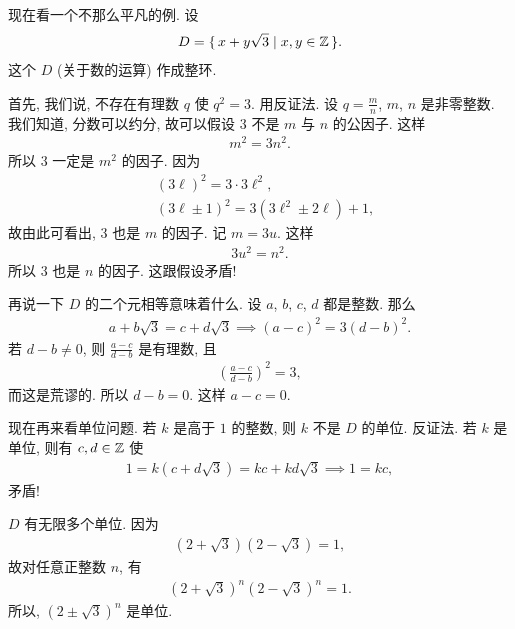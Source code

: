 \begin{example}
    现在看一个不那么平凡的例. 设
    \begin{align*}
        D = \{\, x + y\sqrt{3} \mid x,y \in \mathbb{Z} \,\}.
    \end{align*}
    这个 $D$ (关于数的运算) 作成整环.

    首先, 我们说, 不存在有理数 $q$ 使 $q^2 = 3$. 用反证法. 设 $q = \frac{m}{n}$, $m$, $n$ 是非零整数. 我们知道, 分数可以约分, 故可以假设 $3$ 不是 $m$ 与 $n$ 的公因子. 这样
    \begin{align*}
        m^2 = 3n^2.
    \end{align*}
    所以 $3$ 一定是 $m^2$ 的因子. 因为
    \begin{align*}
         & (3\ell)^2 = 3 \cdot 3\ell^2,                \\
         & (3\ell \pm 1)^2 = 3(3\ell^2 \pm 2\ell) + 1,
    \end{align*}
    故由此可看出, $3$ 也是 $m$ 的因子. 记 $m=3u$. 这样
    \begin{align*}
        3u^2 = n^2.
    \end{align*}
    所以 $3$ 也是 $n$ 的因子. 这跟假设矛盾!

    再说一下 $D$ 的二个元相等意味着什么. 设 $a$, $b$, $c$, $d$ 都是整数. 那么
    \begin{align*}
        a + b\sqrt{3} = c + d\sqrt{3} \implies (a-c)^2 = 3(d-b)^2.
    \end{align*}
    若 $d - b \neq 0$, 则 $\frac{a-c}{d-b}$ 是有理数, 且
    \begin{align*}
        \left( \frac{a-c}{d-b} \right)^2 = 3,
    \end{align*}
    而这是荒谬的. 所以 $d - b = 0$. 这样 $a - c = 0$.

    现在再来看单位问题. 若 $k$ 是高于 $1$ 的整数, 则 $k$ 不是 $D$ 的单位. 反证法. 若 $k$ 是单位, 则有 $c,d \in \mathbb{Z}$ 使
    \begin{align*}
        1 = k(c + d\sqrt{3}) = kc + kd\sqrt{3} \implies 1 = kc,
    \end{align*}
    矛盾!

    $D$ 有无限多个单位. 因为
    \begin{align*}
        (2+\sqrt{3})(2-\sqrt{3})=1,
    \end{align*}
    故对任意正整数 $n$, 有
    \begin{align*}
        (2+\sqrt{3})^n (2-\sqrt{3})^n=1.
    \end{align*}
    所以, $(2 \pm \sqrt{3})^n$ 是单位.
\end{example}

